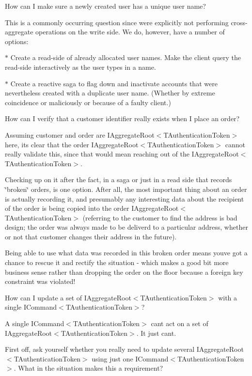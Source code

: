 How can I make sure a newly created user has a unique user name? 

This is a commonly occurring question since we\textquotesingle{}re explicitly not performing cross-\/aggregate operations on the write side. We do, however, have a number of options\+: 

$\ast$ Create a read-\/side of already allocated user names. Make the client query the read-\/side interactively as the user types in a name. 

$\ast$ Create a reactive saga to flag down and inactivate accounts that were nevertheless created with a duplicate user name. (Whether by extreme coincidence or maliciously or because of a faulty client.) 

How can I verify that a customer identifier really exists when I place an order? 

Assuming customer and order are I\+Aggregate\+Root$<$\+T\+Authentication\+Token$>$ here, it\textquotesingle{}s clear that the order I\+Aggregate\+Root$<$\+T\+Authentication\+Token$>$ cannot really validate this, since that would mean reaching out of the I\+Aggregate\+Root$<$\+T\+Authentication\+Token$>$. 

Checking up on it after the fact, in a saga or just in a read side that records \char`\"{}broken\char`\"{} orders, is one option. After all, the most important thing about an order is actually recording it, and presumably any interesting data about the recipient of the order is being copied into the order I\+Aggregate\+Root$<$\+T\+Authentication\+Token$>$ (referring to the customer to find the address is bad design; the order was always made to be deliverd to a particular address, whether or not that customer changes their address in the future). 

Being able to use what data was recorded in this broken order means you\textquotesingle{}ve got a chance to rescue it and rectify the situation -\/ which makes a good bit more business sense rather than dropping the order on the floor because a foreign key constraint was violated! 

How can I update a set of I\+Aggregate\+Root$<$\+T\+Authentication\+Token$>$ with a single I\+Command$<$\+T\+Authentication\+Token$>$? 

A single I\+Command$<$\+T\+Authentication\+Token$>$ can\textquotesingle{}t act on a set of I\+Aggregate\+Root$<$\+T\+Authentication\+Token$>$. It just can\textquotesingle{}t. 

First off, ask yourself whether you really need to update several I\+Aggregate\+Root$<$\+T\+Authentication\+Token$>$ using just one I\+Command$<$\+T\+Authentication\+Token$>$. What in the situation makes this a requirement? 


